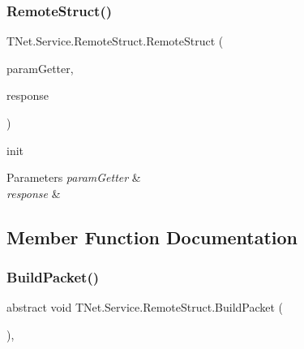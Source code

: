 \subsubsection{\texorpdfstring{Remote\+Struct()}{RemoteStruct()}}
{\footnotesize\ttfamily T\+Net.\+Service.\+Remote\+Struct.\+Remote\+Struct (\begin{DoxyParamCaption}\item[{\mbox{\hyperlink{class_t_net_1_1_service_1_1_action_getter}{Action\+Getter}}}]{param\+Getter,  }\item[{Message\+Structure}]{response }\end{DoxyParamCaption})\hspace{0.3cm}{\ttfamily [protected]}}



init 


\begin{DoxyParams}{Parameters}
{\em param\+Getter} & \\
\hline
{\em response} & \\
\hline
\end{DoxyParams}


\subsection{Member Function Documentation}
\mbox{\label{class_t_net_1_1_service_1_1_remote_struct_ae136ebdadcbb19579175014053f56651}} 
\subsubsection{\texorpdfstring{Build\+Packet()}{BuildPacket()}}
{\footnotesize\ttfamily abstract void T\+Net.\+Service.\+Remote\+Struct.\+Build\+Packet (\begin{DoxyParamCaption}{ }\end{DoxyParamCaption})\hspace{0.3cm}{\ttfamily [protected]}, {}}





\mbox{\label{class_t_net_1_1_service_1_1_remote_struct_a928f5ff2f97d1ec5ad88160befa91941}} 
